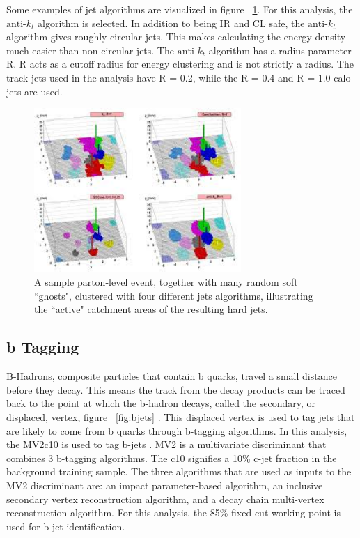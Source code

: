 \indent Some examples of jet algorithms are visualized in figure ~\ref{fig:jetalgo}. For this analysis, the ${\textrm{anti-}k_{t}}$ algorithm is selected. In addition to being IR and CL safe, the ${\textrm{anti-}k_{t}}$ algorithm gives roughly circular jets. This makes calculating the energy density much easier than non-circular jets. The ${\textrm{anti-}k_{t}}$ algorithm has a radius parameter R. R acts as a cutoff radius for energy clustering and is not strictly a radius. The track-jets used in the analysis have R = 0.2, while the R = 0.4 and R = 1.0 calo-jets are used. \newline 

\begin{figure}[h]
\begin{center}
\includegraphics*[width=0.70\textwidth] {figures/jetalgo}
\caption{A sample parton-level event, together with many random soft
``ghosts", clustered with four different jets algorithms, illustrating the ``active" catchment areas of
the resulting hard jets\cite{Cacciari:2008gp}.}
\label{fig:jetalgo}
\end{center}
\end{figure}

\subsection{b Tagging}\label{ssec:btag}
B-Hadrons, composite particles that contain b quarks, travel a small distance before they decay. This means the track from the decay products can be traced back to the point at which the b-hadron decays, called the secondary, or displaced, vertex, figure ~\ref{fig:bjets} . This displaced vertex is used to tag jets that are likely to come from b quarks through b-tagging algorithms.\newline
\indent In this analysis, the MV2c10 is used to tag b-jets \cite{ATL-PHYS-PUB-2016-012}. MV2 is a multivariate discriminant that combines 3 b-tagging algorithms. The c10 signifies a 10\% c-jet fraction in the background training sample. The three algorithms that are used as inputs to the MV2 discriminant are: an impact parameter-based algorithm, an inclusive secondary vertex reconstruction algorithm, and a decay chain multi-vertex reconstruction algorithm. For this analysis, the 85\% fixed-cut working point is used for b-jet identification.\newline

